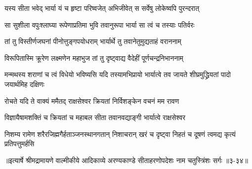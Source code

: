 \twolineshloka
{यस्य सीता भवेद् भार्या यं च हृष्टा परिष्वजेत्}
{अभिजीवेत् स सर्वेषु लोकेष्वपि पुरन्दरात्} %

\twolineshloka
{सा सुशीला वपुःश्लाघ्या रूपेणाप्रतिमा भुवि}
{तवानुरूपा भार्या सा त्वं च तस्याः पतिर्वरः} %

\twolineshloka
{तां तु विस्तीर्णजघनां पीनोत्तुङ्गपयोधराम्}
{भार्यार्थे तु तवानेतुमुद्यताहं वराननाम्} %

\twolineshloka
{विरूपितास्मि क्रूरेण लक्ष्मणेन महाभुज}
{तां तु दृष्ट्वाद्य वैदेहीं पूर्णचन्द्रनिभाननाम्} %

\threelineshloka
{मन्मथस्य शराणां च त्वं विधेयो भविष्यसि}
{यदि तस्यामभिप्रायो भार्यात्वे तव जायते}
{शीघ्रमुद्ध्रियतां पादो जयार्थमिह दक्षिणः} %

\twolineshloka
{रोचते यदि ते वाक्यं ममैतद् राक्षसेश्वर}
{क्रियतां निर्विशङ्केन वचनं मम रावण} %

\twolineshloka
{विज्ञायैषामशक्तिं च क्रियतां च महाबल}
{सीता तवानवद्याङ्गी भार्यात्वे राक्षसेश्वर} %

\twolineshloka
{निशम्य रामेण शरैरजिह्मगैर्हताञ्जनस्थानगतान् निशाचरान्}
{खरं च दृष्ट्वा निहतं च दूषणं त्वमद्य कृत्यं प्रतिपत्तुमर्हसि} %


॥इत्यार्षे श्रीमद्रामायणे वाल्मीकीये आदिकाव्ये अरण्यकाण्डे सीताहरणोपदेशः नाम चतुस्त्रिंशः सर्गः ॥३-३४॥
